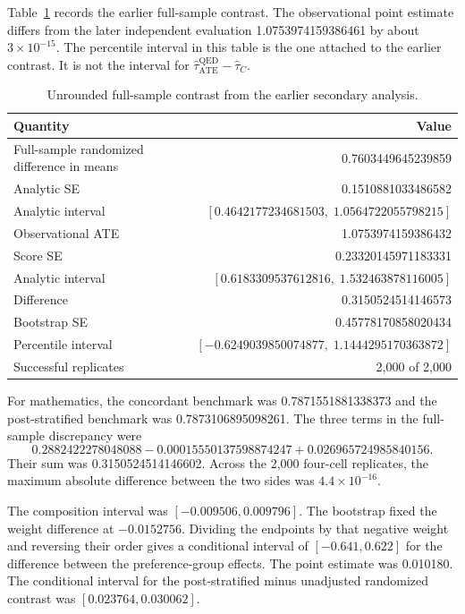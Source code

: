 \documentclass[twoside,11pt]{article}
\begin{document}
Table~\ref{tab:exact-secondary} records the earlier full-sample contrast. The observational point estimate differs from the later independent evaluation 1.0753974159386461 by about $3\times 10^{-15}$. The percentile interval in this table is the one attached to the earlier contrast. It is not the interval for $\widehat\tau^{\mathrm{QED}}_{\mathrm{ATE}}-\widehat\tau_C$.

\begin{table}[ht]
\centering
\caption{Unrounded full-sample contrast from the earlier secondary analysis.}
\label{tab:exact-secondary}
\small
\begin{tabular}{lr}
\toprule
Quantity & Value \\
\midrule
Full-sample randomized difference in means & 0.7603449645239859 \\
Analytic SE & 0.1510881033486582 \\
Analytic interval & $[0.4642177234681503,\; 1.0564722055798215]$ \\
Observational ATE & 1.0753974159386432 \\
Score SE & 0.23320145971183331 \\
Analytic interval & $[0.6183309537612816,\; 1.532463878116005]$ \\
Difference & 0.3150524514146573 \\
Bootstrap SE & 0.45778170858020434 \\
Percentile interval & $[-0.6249039850074877,\; 1.1444295170363872]$ \\
Successful replicates & 2{,}000 of 2{,}000 \\
\bottomrule
\end{tabular}
\end{table}

For mathematics, the concordant benchmark was 0.7871551881338373 and the post-stratified benchmark was 0.7873106895098261. The three terms in the full-sample discrepancy were
\[
  0.2882422278048088 - 0.00015550137598874247 + 0.026965724985840156.
\]
Their sum was 0.3150524514146602. Across the 2,000 four-cell replicates, the maximum absolute difference between the two sides was $4.4\times10^{-16}$.

The composition interval was $[-0.009506, 0.009796]$. The bootstrap fixed the weight difference at $-0.0152756$. Dividing the endpoints by that negative weight and reversing their order gives a conditional interval of $[-0.641, 0.622]$ for the difference between the preference-group effects. The point estimate was 0.010180. The conditional interval for the post-stratified minus unadjusted randomized contrast was $[0.023764, 0.030062]$.
\end{document}
